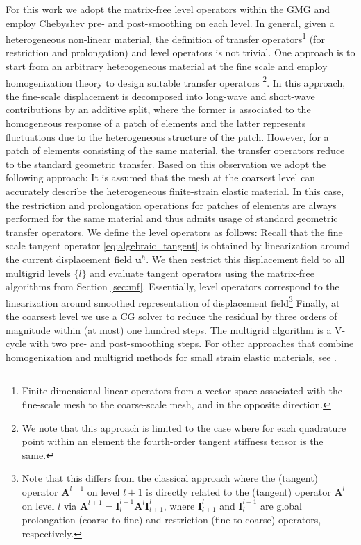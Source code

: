 \documentclass[times,doublespace]{nmeauth}
\def\gz  #1{           \mbox{$\boldsymbol{#1}$}}
\begin{document}
For this work we adopt the matrix-free level operators within the GMG and employ Chebyshev pre- and post-smoothing on each level. In general, given a heterogeneous non-linear material, the definition of transfer operators\footnote{{\color{red}Finite dimensional linear operators from a vector space associated with the fine-scale mesh to the coarse-scale mesh, and in the opposite direction.}} (for restriction and prolongation) and level operators is not trivial. One approach is to start from an arbitrary heterogeneous material at the fine scale and employ homogenization theory \cite{Suquet1987, Hill1972,Hashin1983,Castaneda1997} to design suitable transfer operators \cite{Miehe2007}\footnote{
  We note that this approach is limited to the case where for each quadrature point within an element the fourth-order tangent {\color{red}stiffness tensor} is the same.
}.
In this approach, the fine-scale displacement is decomposed into long-wave and short-wave contributions by an additive split, where the former is associated to the homogeneous response of a patch of elements and the latter represents fluctuations due to the heterogeneous structure of the patch.
However, for a patch of elements consisting of the same material, the transfer operators reduce to the standard geometric transfer.
Based on this observation we adopt the following approach: It is assumed that the mesh at the coarsest level can accurately describe the heterogeneous finite-strain elastic material.
In this case, the restriction and prolongation operations for patches of elements are always performed for the same material and thus admits usage of standard geometric transfer operators.
We define the level operators as follows: Recall that the fine scale tangent {\color{red}operator} \eqref{eq:algebraic_tangent} is obtained by linearization around the current displacement field $\gz u^h$. We then restrict this displacement field to all multigrid levels $\{l\}$ and evaluate tangent operators using the matrix-free algorithms from Section \ref{sec:mf}.
Essentially, level operators correspond to the linearization around smoothed representation of displacement field\footnote{
Note that this differs from the classical approach where the (tangent) operator $\gz A^{l+1}$ on level $l+1$ is directly related to the (tangent) operator $\gz A^{l}$ on level $l$ via $\gz A^{l+1}=\gz I^{l+1}_{l} \gz A^l \gz I^l_{l+1}$, where $\gz I^l_{l+1}$ and $\gz I^{l+1}_l$ are global prolongation (coarse-to-fine) and restriction (fine-to-coarse) operators, respectively.
}
Finally, at the coarsest level we use a CG solver to reduce the residual by three orders of magnitude within (at most) one hundred steps.
The multigrid algorithm is a V-cycle with two pre- and post-smoothing steps. For other approaches that combine homogenization and multigrid methods for small strain elastic materials, see \cite{Bayreuther2003,Fish1995}.
\end{document}
